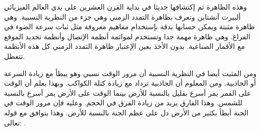 وهذه الظاهرة تم إكتشافها حديثا في بداية القرن العشرين على يدي العالم الفيزيائي ألبيرت آنشتاين وتعرف بظاهرة التمدد الزمني وهي جزء من النظرية النسبية. وهي ظاهرة مثبتة ويمكن حسابها بدقة بإستخدام مفاهيم معروفة مثل ثبات سرعة الضوء في الفراغ. وهي ظاهرة مهمة جدا وتستخدم لموائمة أنظمة الإتصال وأنظمة تحديد الموقع مع الأقمار الصناعية. بدون الأخذ بعين الإعتبار ظاهرة التمدد الزمني كل هذه الأنظمة تتعطل.

ومن المثبت أيضا في النظرية النسبية أن مرور الوقت نسبي وهو يبطأ مع زيادة السرعة أو الجاذبية. ومن المعلوم أن الجاذبية تزداد مع زيادة كتلة الكواكب. وبهذا يعلم أن الوقت على القمر يمر أسرع بقليل بالنسبة للأرض بينما الوقت على الأرض يمر أسرع بالنسبة للشمس. وهذا الفارق يزيد من زيادة الفرق في الحجم. وعليه فإن مرور الوقت في الجنة أبطأ بكثير من الأرض دل على عظم الجنة بالنسبة للأرض. وهذا يتوافق مع قوله تعالى:
\quranayah*[3][133]{\footnotesize \surahname*[3]}.
